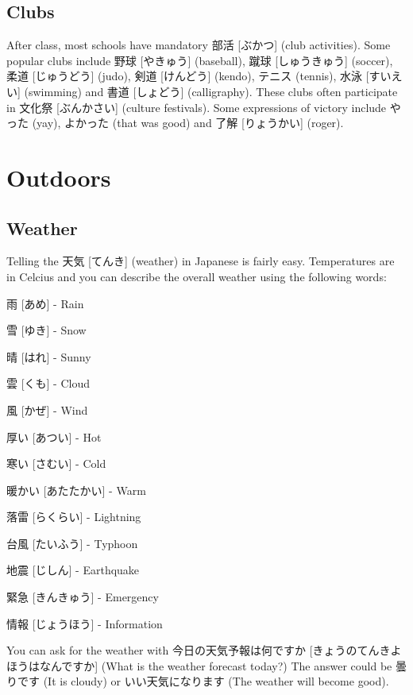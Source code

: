 \documentclass{article}
\begin{document}
\begin{CJK}{UTF8}{min}
\begin{multicols*}{3}
\subsection{Clubs}

After class, most schools have mandatory 部活 [ぶかつ] (club activities). Some popular clubs include 野球 [やきゅう] (baseball), 蹴球 [しゅうきゅう] (soccer), 柔道 [じゅうどう] 
(judo), 剣道 [けんどう] (kendo), テニス (tennis), 水泳 [すいえい] (swimming) and 書道 [しょどう] (calligraphy). These clubs often participate in 文化祭 [ぶんかさい] (culture 
festivals). Some expressions of victory include やった (yay), よかった (that was good) and 了解 [りょうかい] (roger).

\clearpage

\section{Outdoors}

\subsection{Weather}

Telling the 天気 [てんき] (weather) in Japanese is fairly easy. Temperatures are in Celcius and you can describe the overall weather using the following words:

\begin{colorize}
\item 雨 [あめ] - Rain
\item 雪 [ゆき] - Snow
\item 晴 [はれ] - Sunny
\item 雲 [くも] - Cloud
\item 風 [かぜ] - Wind
\item 厚い [あつい] - Hot
\item 寒い [さむい] - Cold
\item 暖かい [あたたかい] - Warm
\item 落雷 [らくらい] - Lightning
\item 台風 [たいふう] - Typhoon
\item 地震 [じしん] - Earthquake
\item 緊急 [きんきゅう] - Emergency
\item 情報 [じょうほう] - Information
\end{colorize}

You can ask for the weather with 今日の天気予報は何ですか [きょうのてんきよほうはなんですか] (What is the weather forecast today?) The answer could be 曇りです (It is cloudy) or 
いい天気になります (The weather will become good).


\end{multicols*}
\end{CJK}
\end{document}
